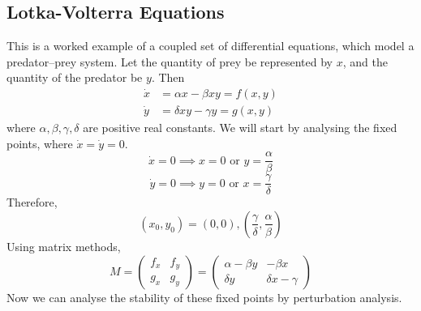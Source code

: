 \subsection{Lotka-Volterra Equations}
This is a worked example of a coupled set of differential equations, which model a predator--prey system. Let the quantity of prey be represented by \(x\), and the quantity of the predator be \(y\). Then
\begin{align*}
	\dot x & = \alpha x - \beta xy = f(x, y) \\
	\dot y & = \delta xy - \gamma y = g(x,y)
\end{align*}
where \(\alpha, \beta, \gamma, \delta\) are positive real constants. We will start by analysing the fixed points, where \(\dot x = \dot y = 0\).
\[ \dot x = 0 \implies x=0 \text{ or } y = \frac{\alpha}{\beta} \]
\[ \dot y = 0 \implies y=0 \text{ or } x = \frac{\gamma}{\delta} \]
Therefore,
\[ (x_0, y_0) = (0, 0), \left( \frac{\gamma}{\delta}, \frac{\alpha}{\beta} \right) \]
Using matrix methods,
\[ M = \begin{pmatrix}
		f_x & f_y \\
		g_x & g_y
	\end{pmatrix} = \begin{pmatrix}
		\alpha - \beta y & -\beta x          \\
		\delta y         & \delta x - \gamma
	\end{pmatrix} \]
Now we can analyse the stability of these fixed points by perturbation analysis.
